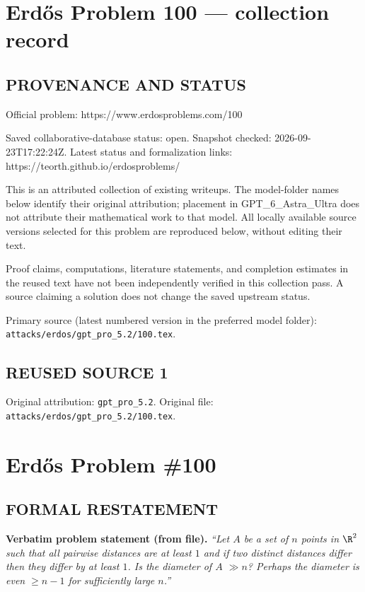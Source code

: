 \section*{Erd\H{o}s Problem 100 --- collection record}

\subsection*{PROVENANCE AND STATUS}
Official problem: https://www.erdosproblems.com/100

Saved collaborative-database status: open.
Snapshot checked: 2026-09-23T17:22:24Z.
Latest status and formalization links: https://teorth.github.io/erdosproblems/

This is an attributed collection of existing writeups. The model-folder names below identify their original attribution; placement in GPT\_6\_Astra\_Ultra does not attribute their mathematical work to that model. All locally available source versions selected for this problem are reproduced below, without editing their text.

Proof claims, computations, literature statements, and completion estimates in the reused text have not been independently verified in this collection pass. A source claiming a solution does not change the saved upstream status.

Primary source (latest numbered version in the preferred model folder): \texttt{attacks/erdos/gpt\_pro\_5.2/100.tex}.

\subsection*{REUSED SOURCE 1}
Original attribution: \texttt{gpt\_pro\_5.2}.
Original file: \texttt{attacks/erdos/gpt\_pro\_5.2/100.tex}.

\section*{Erd\H{o}s Problem \#100}

\subsection*{FORMAL RESTATEMENT}
\noindent\textbf{Verbatim problem statement (from file).}
\emph{``Let $A$ be a set of $n$ points in $\R^2$ such that all pairwise distances are at least $1$ and if two distinct distances differ then they differ by at least $1$. Is the diameter of $A$ $\gg n$? Perhaps the diameter is even $\ge n-1$ for sufficiently large $n$.''}

